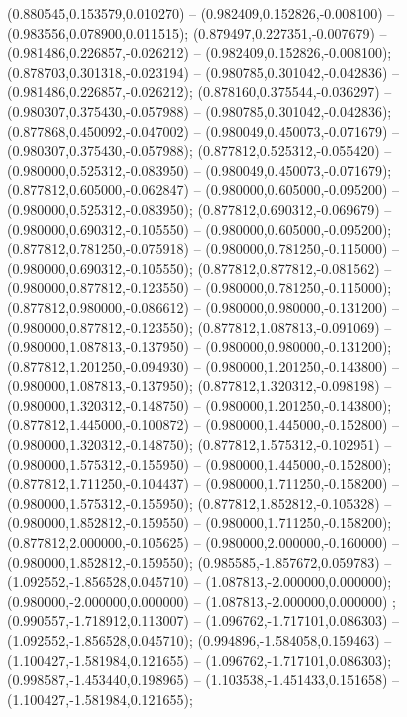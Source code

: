  (0.880545,0.153579,0.010270) -- (0.982409,0.152826,-0.008100) -- (0.983556,0.078900,0.011515);
 (0.879497,0.227351,-0.007679) -- (0.981486,0.226857,-0.026212) -- (0.982409,0.152826,-0.008100);
 (0.878703,0.301318,-0.023194) -- (0.980785,0.301042,-0.042836) -- (0.981486,0.226857,-0.026212);
 (0.878160,0.375544,-0.036297) -- (0.980307,0.375430,-0.057988) -- (0.980785,0.301042,-0.042836);
 (0.877868,0.450092,-0.047002) -- (0.980049,0.450073,-0.071679) -- (0.980307,0.375430,-0.057988);
 (0.877812,0.525312,-0.055420) -- (0.980000,0.525312,-0.083950) -- (0.980049,0.450073,-0.071679);
 (0.877812,0.605000,-0.062847) -- (0.980000,0.605000,-0.095200) -- (0.980000,0.525312,-0.083950);
 (0.877812,0.690312,-0.069679) -- (0.980000,0.690312,-0.105550) -- (0.980000,0.605000,-0.095200);
 (0.877812,0.781250,-0.075918) -- (0.980000,0.781250,-0.115000) -- (0.980000,0.690312,-0.105550);
 (0.877812,0.877812,-0.081562) -- (0.980000,0.877812,-0.123550) -- (0.980000,0.781250,-0.115000);
 (0.877812,0.980000,-0.086612) -- (0.980000,0.980000,-0.131200) -- (0.980000,0.877812,-0.123550);
 (0.877812,1.087813,-0.091069) -- (0.980000,1.087813,-0.137950) -- (0.980000,0.980000,-0.131200);
 (0.877812,1.201250,-0.094930) -- (0.980000,1.201250,-0.143800) -- (0.980000,1.087813,-0.137950);
 (0.877812,1.320312,-0.098198) -- (0.980000,1.320312,-0.148750) -- (0.980000,1.201250,-0.143800);
 (0.877812,1.445000,-0.100872) -- (0.980000,1.445000,-0.152800) -- (0.980000,1.320312,-0.148750);
 (0.877812,1.575312,-0.102951) -- (0.980000,1.575312,-0.155950) -- (0.980000,1.445000,-0.152800);
 (0.877812,1.711250,-0.104437) -- (0.980000,1.711250,-0.158200) -- (0.980000,1.575312,-0.155950);
 (0.877812,1.852812,-0.105328) -- (0.980000,1.852812,-0.159550) -- (0.980000,1.711250,-0.158200);
 (0.877812,2.000000,-0.105625) -- (0.980000,2.000000,-0.160000) -- (0.980000,1.852812,-0.159550);
 (0.985585,-1.857672,0.059783) -- (1.092552,-1.856528,0.045710) -- (1.087813,-2.000000,0.000000);
 (0.980000,-2.000000,0.000000) -- (1.087813,-2.000000,0.000000) ;
 (0.990557,-1.718912,0.113007) -- (1.096762,-1.717101,0.086303) -- (1.092552,-1.856528,0.045710);
 (0.994896,-1.584058,0.159463) -- (1.100427,-1.581984,0.121655) -- (1.096762,-1.717101,0.086303);
 (0.998587,-1.453440,0.198965) -- (1.103538,-1.451433,0.151658) -- (1.100427,-1.581984,0.121655);
